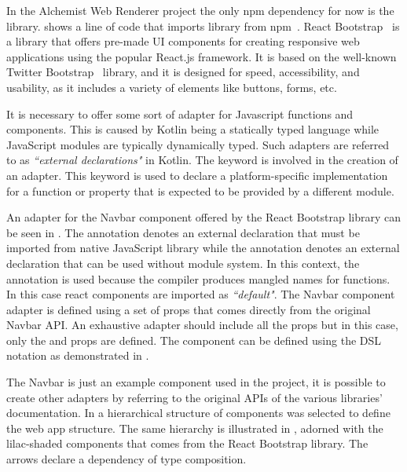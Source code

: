 In the Alchemist Web Renderer project the only npm dependency for now is the  library.  shows a line of code that imports library from npm~\cite{Usedepen41:online}.
React Bootstrap~\cite{reactboo79:online} is a library that offers pre-made UI components for creating responsive web applications using the popular React.js framework. It is based on the well-known Twitter Bootstrap~\cite{Bootstra57:online} library, and it is designed for speed, accessibility, and usability, as it includes a variety of elements like buttons, forms, etc.\newline

It is necessary to offer some sort of adapter for Javascript functions and components. This is caused by Kotlin being a statically typed language while JavaScript modules are typically dynamically typed. Such adapters are referred to as \textit{``external declarations"} in Kotlin. The  keyword is involved in the creation of an adapter. This keyword is used to declare a platform-specific implementation for a function or property that is expected to be provided by a different module.\newline





An adapter for the Navbar component offered by the React Bootstrap library can be seen in . The  annotation denotes an external declaration that must be imported from native JavaScript library while the  annotation denotes an external declaration that can be used without module system. In this context, the  annotation is used because the compiler produces mangled names for functions. In this case react components are imported as \textit{``default"}. The Navbar component adapter is defined using a set of props that comes directly from the original Navbar API. An exhaustive adapter should include all the props but in this case, only the  and  props are defined. The component can be defined using the DSL notation as demonstrated in .\newline



The Navbar is just an example component used in the project, it is possible to create other adapters by referring to the original APIs of the various libraries' documentation. In  a hierarchical structure of components was selected to define the web app structure. The same hierarchy is illustrated in , adorned with the lilac-shaded components that comes from the React Bootstrap library. The arrows declare a dependency of type composition.

